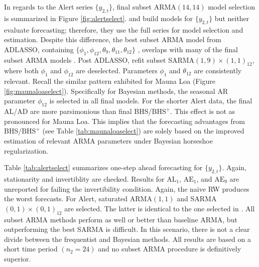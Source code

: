 In regards to the Alert series $\{y_{2,t}\}$, final subset ARMA$(14,14)$ model selection is summarized in Figure \ref{fig:alertselect}. \citet{Cryer2008} and \citet{Chen2011}  build models for $\{y_{2,t}\}$ but neither evaluate forecasting; therefore, they use the full series for model selection and estimation. Despite this difference, the best subset ARMA model from ADLASSO, containing $\{\phi_1,\phi_{12},\theta_9,\theta_{11},\theta_{12}\}$ , overlaps with many of the final subset ARMA models \citep{Chen2011}. Post ADLASSO, \cite{Chen2011} refit subset SARMA$(1,9)\times(1,1)_{12}$, where both $\phi_1$ and $\phi_{12}$ are deselected. Parameters $\phi_1$ and $\theta_{12}$ are consistently relevant. Recall the similar pattern exhibited for Mauna Loa (Figure \ref{fig:maunaloaselect}). Specifically for Bayesian methods, the seasonal AR parameter $\phi_{12}$ is selected in all final models. For the shorter Alert data, the final AL/AD are more parsimonious than final BHS/$\textrm{BHS}^+$. This effect is not as pronounced for Mauna Loa. This implies that the forecasting advantages from  BHS/$\textrm{BHS}^+$ (see Table \ref{tab:maunaloaselect}) are solely based on the improved estimation of relevant ARMA parameters under Bayesian horseshoe regularization.

Table \ref{tab:alertselect} summarizes one-step ahead forecasting for $\{y_{2,t}\}$. Again, stationarity and invertiblity are checked. Results for $\textrm{AL}_1$, $\textrm{AE}_1$, and $\textrm{AE}_9$ are unreported for failing the invertibility condition. Again, the naive RW produces the worst forecasts. For Alert, saturated ARMA$(1,1)$ and SARMA$(0,1)\times(0,1)_{12}$ are selected. The latter is identical to the one selected in \cite{Cryer2008}. All subset ARMA methods perform as well or better than baseline ARMA, but outperforming the best SARMA  is difficult. In this scenario, there is not a clear divide between the frequentist and Bayesian methods. All results are based on a short time period $(n_2=24)$ and no subset ARMA procedure is definitively superior. 

